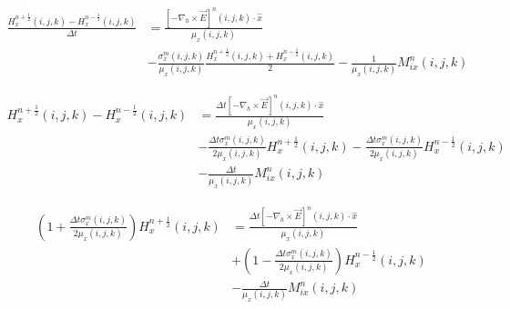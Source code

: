 \documentclass[10pt]{article}
\begin{document}
\begin{equation}
	\begin{aligned}
		\frac{H^{n+\frac{1}{2}}_{x}(i,j,k) - H^{n-\frac{1}{2}}_{x}(i,j,k)}{\Delta t} & =
		\frac{\left[ -\nabla_h\times \vec{E} \right]^{n}(i,j,k) \cdot \hat{x}}{\mu_{{x}}(i,j,k)}                                                                                                             \\
		                                                                             & - \frac{\sigma^{m}_{x}(i,j,k)}{\mu_{x}(i,j,k)}  \frac{H^{n+\frac{1}{2}}_{x}(i,j,k)+H^{n-\frac{1}{2}}_{x}(i,j,k)}{2}
		- \frac{1}{\mu_{x}(i,j,k)} M^{n}_{ix}(i,j,k)
	\end{aligned}
\end{equation}

\begin{equation}
	\begin{aligned}
		H^{n+\frac{1}{2}}_{x}(i,j,k) - H^{n-\frac{1}{2}}_{x}(i,j,k) & =
		\frac{\Delta t \left[ -\nabla_h\times \vec{E} \right]^{n}(i,j,k) \cdot \hat{x}}{\mu_{{x}}(i,j,k)}                                                                                                                                           \\
		                                                            & - \frac{\Delta t\sigma^{m}_{x}(i,j,k)}{2\mu_{x}(i,j,k)}  H^{n+\frac{1}{2}}_{x}(i,j,k)- \frac{\Delta t\sigma^{m}_{x}(i,j,k)}{2\mu_{x}(i,j,k)}   H^{n-\frac{1}{2}}_{x}(i,j,k) \\
		                                                            & - \frac{\Delta t}{\mu_{x}(i,j,k)} M^{n}_{ix}(i,j,k)
	\end{aligned}
\end{equation}



\begin{equation}
	\begin{aligned}
		\left(1 + \frac{\Delta t \sigma^{m}_{x}(i,j,k)}{2\mu_{x}(i,j,k)} \right) H^{n+\frac{1}{2}}_{x}(i,j,k) & =
		\frac{\Delta t \left[ -\nabla_h\times \vec{E} \right]^{n}(i,j,k) \cdot \hat{x}}{\mu_{{x}}(i,j,k)}                                                                                                                    \\
		                                                                                                      & + \left( 1 - \frac{\Delta t \sigma^{m}_{x}(i,j,k)}{2\mu_{x}(i,j,k)} \right)   H^{n-\frac{1}{2}}_{x}(i,j,k) \\
		                                                                                                      & - \frac{\Delta t}{\mu_{x}(i,j,k)} M^{n}_{ix}(i,j,k)
	\end{aligned}
\end{equation}
\end{document}
